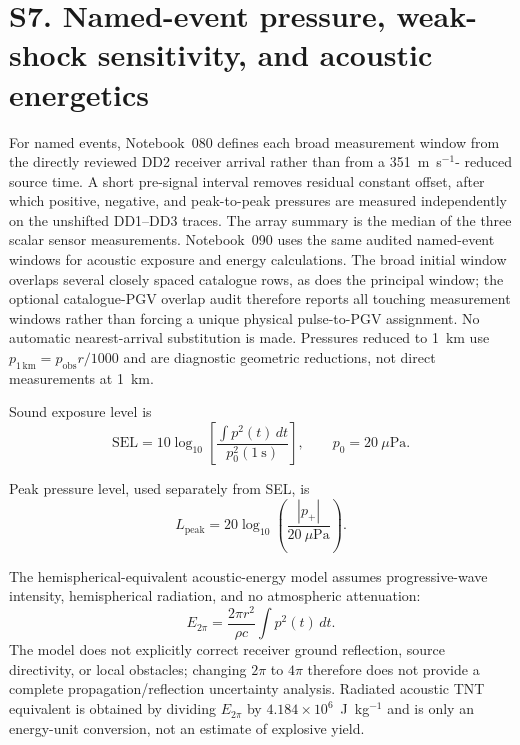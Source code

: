 \documentclass[]{seismica}
\begin{document}
\FloatBarrier


\section*{S7. Named-event pressure, weak-shock sensitivity, and acoustic energetics}
\label{sec:supp_energy}

For named events, Notebook~080 defines each broad measurement window from the
directly reviewed DD2 receiver arrival rather than from a 351~m~s$^{-1}$-
reduced source time. A short pre-signal interval removes residual constant
offset, after which positive, negative, and peak-to-peak pressures are measured
independently on the unshifted DD1--DD3 traces. The array summary is the median
of the three scalar sensor measurements. Notebook~090 uses the same audited
named-event windows for acoustic exposure and energy calculations. The broad
initial window overlaps several closely spaced catalogue rows, as does the
principal window; the optional catalogue-PGV overlap audit therefore reports
all touching measurement windows rather than forcing a unique physical
pulse-to-PGV assignment. No automatic nearest-arrival substitution is made.
Pressures reduced to 1~km use
$p_{1\,\mathrm{km}}=p_{\mathrm{obs}}r/1000$ and are diagnostic geometric
reductions, not direct measurements at 1~km.

Sound exposure level is
\begin{equation}
 \mathrm{SEL}=10\log_{10}\left[
 \frac{\int p^2(t)\,dt}{p_0^2(1~\mathrm{s})}\right],
 \qquad p_0=20~\mu\mathrm{Pa}.
\end{equation}

Peak pressure level, used separately from SEL, is
\begin{equation}
 L_{\mathrm{peak}}=
 20\log_{10}\left(\frac{|p_+|}{20~\mu\mathrm{Pa}}\right).
\end{equation}

The hemispherical-equivalent acoustic-energy model assumes progressive-wave
intensity, hemispherical radiation, and no atmospheric attenuation:
\begin{equation}
 E_{2\pi}=\frac{2\pi r^2}{\rho c}\int p^2(t)\,dt.
\end{equation}
The model does not explicitly correct receiver ground reflection, source
directivity, or local obstacles; changing $2\pi$ to $4\pi$ therefore does not
provide a complete propagation/reflection uncertainty analysis. Radiated
acoustic TNT equivalent is obtained by dividing $E_{2\pi}$ by
$4.184\times10^6$~J~kg$^{-1}$ and is only an energy-unit conversion, not an
estimate of explosive yield.
\end{document}
